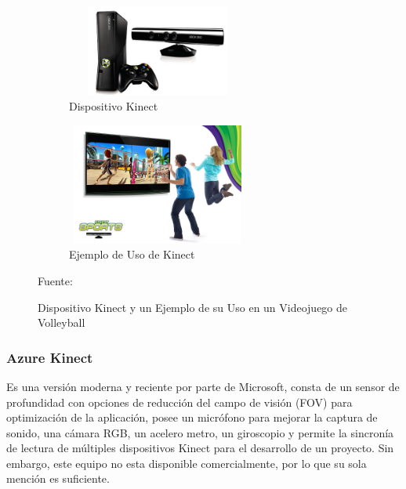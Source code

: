 \begin{figure}
	\centering
	\begin{subfigure}{.5\textwidth}
		\centering
		\includegraphics[width=6cm,height=3cm,]{./Images/kinectex.jpg}
		\caption{Dispositivo Kinect}
		\label{kinectex}
	\end{subfigure}%
	\begin{subfigure}{0.5\textwidth}
		\centering
		\includegraphics[width=6cm,height=4cm,]{./Images/kinectexuse.jpg}
		\caption{Ejemplo de Uso de Kinect}
		\label{kinectexuse}
	\end{subfigure}
	\caption{Dispositivo Kinect y un Ejemplo de su Uso en un Videojuego de Volleyball}
	\label{kinectExample}
	\footnotesize Fuente: \cite{kinectex} \cite{kinectexuse}
\end{figure}

\subsubsection{Azure Kinect}

Es una versión moderna y reciente por parte de Microsoft, consta de un sensor de profundidad con opciones de reducción del campo de visión (FOV) para optimización de la aplicación, posee un micrófono para mejorar la captura de sonido, una cámara RGB, un acelero metro, un giroscopio y permite la sincronía de lectura de múltiples dispositivos Kinect para el desarrollo de un proyecto. Sin embargo, este equipo no esta disponible comercialmente, por lo que su sola mención es suficiente.

